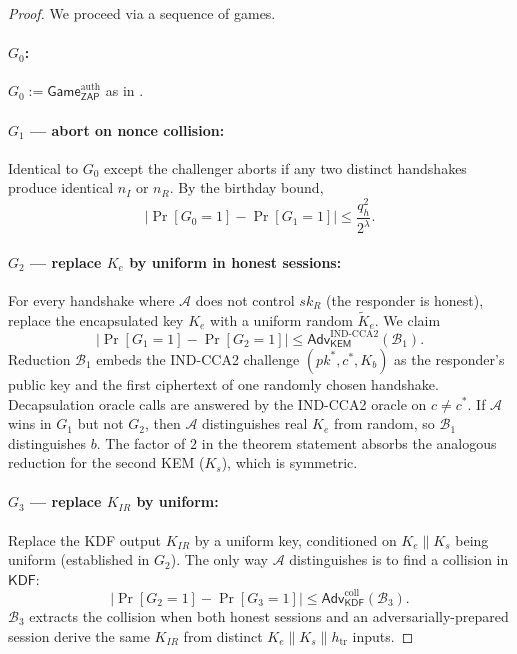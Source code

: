 \documentclass[11pt,a4paper]{article}
\theoremstyle{plain}
\theoremstyle{definition}
\newcommand{\Adv}{\mathsf{Adv}}
\newcommand{\GameG}{\mathsf{Game}}
\newcommand{\KEM}{\mathsf{KEM}}
\newcommand{\KDF}{\mathsf{KDF}}
\newcommand{\ZAP}{\mathsf{ZAP}}
\begin{document}
\begin{proof}
We proceed via a sequence of games.

\paragraph{$G_0$:} $G_0 := \GameG_\ZAP^{\text{auth}}$ as in
.

\paragraph{$G_1$ --- abort on nonce collision:} Identical to $G_0$ except
the challenger aborts if any two distinct handshakes produce identical
$n_I$ or $n_R$. By the birthday bound,
\[
|\Pr[G_0 = 1] - \Pr[G_1 = 1]| \le \frac{q_h^2}{2^\lambda}.
\]

\paragraph{$G_2$ --- replace $K_e$ by uniform in honest sessions:} For
every handshake where $\mathcal{A}$ does not control $sk_R$ (the
responder is honest), replace the encapsulated key $K_e$ with a uniform
random $\tilde K_e$. We claim
\[
|\Pr[G_1 = 1] - \Pr[G_2 = 1]| \le \Adv_{\KEM}^{\mathrm{IND\text{-}CCA2}}(\mathcal{B}_1).
\]
Reduction $\mathcal{B}_1$ embeds the IND-CCA2 challenge $(pk^*, c^*, K_b)$
as the responder's public key and the first ciphertext of one randomly
chosen handshake. Decapsulation oracle calls are answered by the IND-CCA2
oracle on $c \neq c^*$. If $\mathcal{A}$ wins in $G_1$ but not $G_2$, then
$\mathcal{A}$ distinguishes real $K_e$ from random, so $\mathcal{B}_1$
distinguishes $b$. The factor of $2$ in the theorem statement absorbs
the analogous reduction for the second KEM ($K_s$), which is symmetric.

\paragraph{$G_3$ --- replace $K_{IR}$ by uniform:} Replace the KDF output
$K_{IR}$ by a uniform key, conditioned on $K_e \| K_s$ being uniform
(established in $G_2$). The only way $\mathcal{A}$ distinguishes is to
find a collision in $\KDF$:
\[
|\Pr[G_2 = 1] - \Pr[G_3 = 1]| \le \Adv_{\KDF}^{\mathrm{coll}}(\mathcal{B}_3).
\]
$\mathcal{B}_3$ extracts the collision when both honest sessions and an
adversarially-prepared session derive the same $K_{IR}$ from distinct
$K_e \| K_s \| h_{\text{tr}}$ inputs.


\end{proof}
\end{document}
